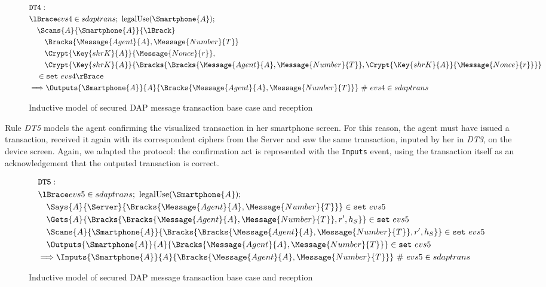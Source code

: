 \begin{figure}[!h]
  \begin{align*}
    & \texttt{DT4}: \newline \\
    & \lBrace evs4 \in sdaptrans;\ \text{legalUse}(\Smartphone{A}); \\
    & \quad \Scans{A}{\Smartphone{A}}{\lBrack} \\
    & \qquad \Bracks{\Message{Agent}{A}, \Message{Number}{T}} \\
    & \qquad \Crypt{\Key{shrK}{A}}{\Message{Nonce}{r}}, \\
    & \qquad \Crypt{\Key{shrK}{A}}{\Bracks{\Bracks{\Message{Agent}{A}, \Message{Number}{T}}, \Crypt{\Key{shrK}{A}}{\Message{Nonce}{r}}}} \\
    & \quad \in \texttt{set} \ evs4 \rBrace \\
    & \Longrightarrow \Outputs{\Smartphone{A}}{A}{\Bracks{\Message{Agent}{A}, \Message{Number}{T}}} \ \# \ evs4 \in sdaptrans
  \end{align*}
  \label{fig:dap-model-4}
  \caption{Inductive model of secured DAP message transaction base case and reception}
\end{figure}

Rule \textit{DT5} models the agent confirming the visualized transaction in her smartphone screen. For this reason, the agent must have issued a transaction, received it again with its correspondent ciphers from the Server and saw the same transaction, inputed by her in \textit{DT3}, on the device screen. Again, we adapted the protocol: the confirmation act is represented with the \texttt{Inputs} event, using the transaction itself as an acknowledgement that the outputed transaction is correct.

\begin{figure}[!h]
  \begin{align*}
    & \texttt{DT5}: \newline \\
    & \lBrace evs5 \in sdaptrans;\ \text{legalUse}(\Smartphone{A}); \\
    & \quad \Says{A}{\Server}{\Bracks{\Message{Agent}{A}, \Message{Number}{T}}} \in \texttt{set} \ evs5 \\
    & \quad \Gets{A}{\Bracks{\Bracks{\Message{Agent}{A}, \Message{Number}{T}}, r', h_S}} \in \texttt{set} \ evs5 \\
    & \quad \Scans{A}{\Smartphone{A}}{\Bracks{\Bracks{\Message{Agent}{A}, \Message{Number}{T}}, r', h_S}} \in \texttt{set} \ evs5 \\
    & \quad \Outputs{\Smartphone{A}}{A}{\Bracks{\Message{Agent}{A}, \Message{Number}{T}}} \in \texttt{set} \ evs5 \\
    & \Longrightarrow \Inputs{\Smartphone{A}}{A}{\Bracks{\Message{Agent}{A}, \Message{Number}{T}}} \ \# \ evs5 \in sdaptrans
  \end{align*}
  \label{fig:dap-model-5}
  \caption{Inductive model of secured DAP message transaction base case and reception}
\end{figure}

